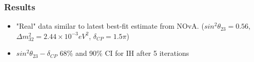 \documentclass[9pt, aspectratio=169]{beamer}
\begin{document}
\begin{frame}
  \frametitle{Results}
  \begin{itemize}
    \item "Real" data similar to latest best-fit estimate from NOvA. ($sin^{2}\theta_{23} = 0.56$, $\Delta m^2_{32} = 2.44\times10^{-3} eV^{2}$, $\delta_{CP} = 1.5\pi$)
    \item $sin^{2}\theta_{23}-\delta_{CP}$ 68\% and 90\% CI for IH after 5 iterations
  \end{itemize}
  \begin{columns}

\end{columns}
\end{frame}
\end{document}
